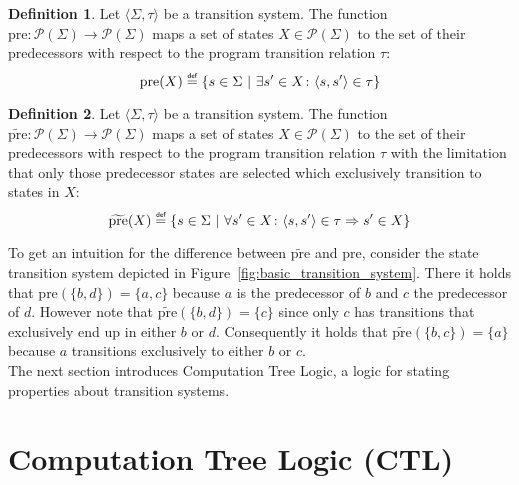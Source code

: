 \documentclass[11pt,a4paper,titlepage]{article}
\theoremstyle{definition}
\newtheorem{definition}{Definition}[section]
\newcommand\eqdef{\mathrel{\overset{\makebox[0pt]{\mbox{\normalfont\tiny\sffamily def}}}{=}}}
\begin{document}
\begin{definition}\label{def:pre}
    Let $\langle \Sigma, \tau \rangle$ be a transition system. The function $\text{pre} \colon \mathcal{P}(\Sigma) \to \mathcal{P}(\Sigma)$
    maps a set of states $X \in \mathcal{P}(\Sigma)$ to the set of their predecessors with respect to the program transition
    relation $\tau$:
\begin{equation}
    \text{pre}(X) \eqdef \{s \in \Sigma \ | \ \exists s' \in X \colon \langle s, s' \rangle \in \tau \}  
\end{equation}
\end{definition}


\begin{definition}\label{def:tilde_pre}
    Let $\langle \Sigma, \tau \rangle$ be a transition system. The function $\widetilde{\text{pre}} \colon \mathcal{P}(\Sigma) \to \mathcal{P}(\Sigma)$
    maps a set of states $X \in \mathcal{P}(\Sigma)$ to the set of their predecessors with respect to the program transition
    relation $\tau$ with the limitation that only those predecessor states are selected which exclusively transition to states in $X$:
\begin{equation}
    \widetilde{\text{pre}}(X) \eqdef \{s \in \Sigma \ | \ \forall s' \in X \colon \langle s, s' \rangle \in \tau \Rightarrow s' \in X \}  
\end{equation}
\end{definition}

To get an intuition for the difference between $\widetilde{\text{pre}}$ and $\text{pre}$, consider the state transition system 
depicted in Figure~\ref{fig:basic_transition_system}. There it holds that $\text{pre}(\{b, d\}) = \{a, c\}$ 
because $a$ is the predecessor of $b$ and $c$ the predecessor of $d$. 
However note that $\widetilde{\text{pre}}(\{b, d\}) = \{c\}$ since only $c$ has 
transitions that exclusively end up in either $b$ or $d$. 
Consequently it holds that $\widetilde{\text{pre}}(\{b, c\}) = \{a\}$ because $a$ transitions exclusively to either $b$ or $c$.\\

The next section introduces Computation Tree Logic, 
a logic for stating properties about transition systems.  

\section{Computation Tree Logic (CTL)}\label{sec:computation_tree_logic}
\end{document}
